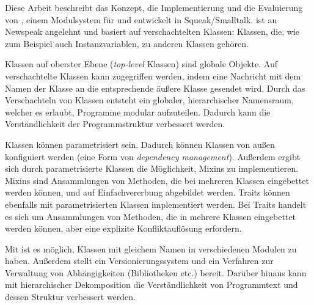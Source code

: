 \begin{zusammenfassung}
Diese Arbeit beschreibt das Konzept, die Implementierung und die Evaluierung von \msname, einem Modulsystem für und entwickelt in Squeak/Smalltalk. \msname ist an Newspeak angelehnt und basiert auf verschachtelten Klassen: Klassen, die, wie zum Beispiel auch Instanzvariablen, zu anderen Klassen gehören.

Klassen auf oberster Ebene (\emph{top-level} Klassen) sind globale Objekte. Auf verschachtelte Klassen kann zugegriffen werden, indem eine Nachricht mit dem Namen der Klasse an die entsprechende äußere Klasse gesendet wird. Durch das Verschachteln von Klassen entsteht ein globaler, hierarchischer Namensraum, welcher es erlaubt, Programme modular aufzuteilen. Dadurch kann die Verständlichkeit der Programmstruktur verbessert werden.

Klassen können parametrisiert sein. Dadurch können Klassen von außen konfiguiert werden (eine Form von \emph{dependency management}). Außerdem ergibt sich durch parametrisierte Klassen die Möglichkeit, Mixins zu implementieren. Mixins sind Ansammlungen von Methoden, die bei mehreren Klassen eingebettet werden können, und auf Einfachvererbung abgebildet werden. Traits können ebenfalls mit parametrisierten Klassen implementiert werden. Bei Traits handelt es sich um Ansammlungen von Methoden, die in mehrere Klassen eingebettet werden können, aber eine explizite Konfliktauflösung erfordern.

Mit \msname ist es möglich, Klassen mit gleichem Namen in verschiedenen Modulen zu haben. Außerdem stellt \msname ein Versionierungssystem und ein Verfahren zur Verwaltung  von Abhängigkeiten (Bibliotheken etc.) bereit. Darüber hinaus kann mit hierarchischer Dekomposition die Verständlichkeit von Programmtext und dessen Struktur verbessert werden.
\end{zusammenfassung}

